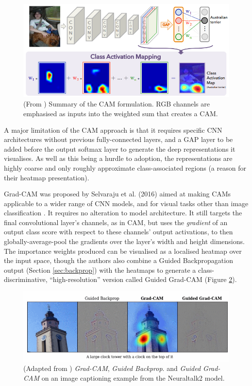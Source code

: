 \documentclass[main]{subfiles}
\begin{document}
\begin{figure}[h]
\centering
\includegraphics[scale=0.5]{cam.png}
\caption{(From \cite{cam}) Summary of the CAM formulation. RGB channels are emphasised as inputs into the weighted sum that creates a CAM.}
\label{camimg}
\end{figure}

A major limitation of the CAM approach is that it requires specific CNN architectures without previous fully-connected layers, and a GAP layer to be added before the output softmax layer to generate the deep representations it visualises. As well as this being a hurdle to adoption, the representations are highly coarse and only roughly approximate class-associated regions (a reason for their heatmap presentation).

Grad-CAM was proposed by Selvaraju et al. (2016) aimed at making CAMs applicable to a wider range of CNN models, and for visual tasks other than image classification \cite{gradcam}. It requires no alteration to model architecture. It still targets the final convolutional layer's channels, as in CAM, but uses the \textit{gradient} of an output class score with respect to these channels' output activations, to then globally-average-pool the gradients over the layer's width and height dimensions. The importance weights produced can be visualised as a localised heatmap over the input space, though the authors also combine a Guided Backpropagation output (Section \ref{sec:backprop}) with the heatmaps to generate a class-discriminative, ``high-resolution'' version called Guided Grad-CAM (Figure \ref{gradimg}).

\begin{figure}[h]
\centering
\includegraphics[scale=0.6]{gradcam_I.png}
\caption{(Adapted from \cite{gradcam}) \textit{Grad-CAM}, \textit{Guided Backprop}. and \textit{Guided Grad-CAM} on an image captioning example from the Neuraltalk2 model.}
\label{gradimg}
\end{figure}
\end{document}
